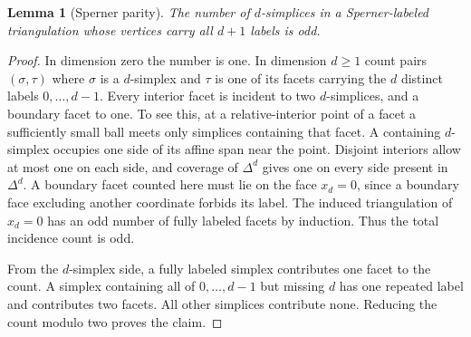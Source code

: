 \documentclass[11pt,oneside,openany]{book}
\theoremstyle{plain}
\newtheorem{lemma}[theorem]{Lemma}
\theoremstyle{definition}
\theoremstyle{remark}
\begin{document}
\begin{lemma}[Sperner parity]
\label{lem:sperner-parity}
The number of \(d\)-simplices in a Sperner-labeled triangulation
whose vertices carry all \(d+1\) labels is odd.
\end{lemma}
\begin{proof}
In dimension zero the number is one. In dimension \(d\ge1\)
count pairs \((\sigma,\tau)\) where \(\sigma\) is a
\(d\)-simplex and \(\tau\) is one of its facets carrying
the \(d\) distinct labels \(0,\ldots,d-1\). Every interior
facet is incident to two \(d\)-simplices, and a boundary
facet to one. To see this, at a relative-interior point
of a facet a sufficiently small ball meets only simplices
containing that facet. A containing \(d\)-simplex occupies
one side of its affine span near the point. Disjoint
interiors allow at most one on each side, and coverage of
\(\Delta^d\) gives one on every side present in \(\Delta^d\).
A boundary facet counted here must lie on the face
\(x_d=0\), since a boundary face excluding another coordinate
forbids its label. The induced triangulation of \(x_d=0\)
has an odd number of fully labeled facets by induction.
Thus the total incidence count is odd.

From the \(d\)-simplex side, a fully labeled simplex
contributes one facet to the count. A simplex containing
all of \(0,\ldots,d-1\) but missing \(d\) has one repeated
label and contributes two facets. All other simplices
contribute none. Reducing the count modulo two proves the claim.
\end{proof}
\end{document}
